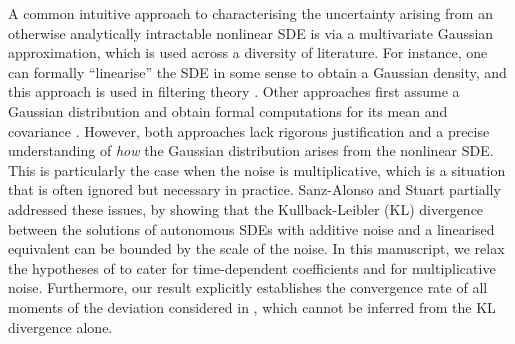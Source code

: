 A common intuitive approach to characterising the uncertainty arising from an otherwise analytically intractable nonlinear SDE is via a multivariate Gaussian approximation, which is used across a diversity of literature. 
For instance, one can formally ``linearise'' the SDE in some sense to obtain a Gaussian density, and this approach is used in filtering theory \cite{Jazwinski_2014_StochasticProcessesFiltering}.
Other approaches first assume a Gaussian distribution and obtain formal computations for its mean and covariance \cite{SarkkaSolin_2019_AppliedStochasticDifferential}.
However, both approaches lack rigorous justification and a precise understanding of \emph{how} the Gaussian distribution arises from the nonlinear SDE.
This is particularly the case when the noise is multiplicative, which is a situation that is often ignored but necessary in practice.
Sanz-Alonso and Stuart \cite{Sanz-AlonsoStuart_2017_GaussianApproximationsSmall} partially addressed these issues, by showing that the Kullback-Leibler (KL) divergence between the solutions of autonomous SDEs with additive noise and a linearised equivalent can be bounded by the scale of the noise. In this manuscript, we relax the hypotheses of \cite{Sanz-AlonsoStuart_2017_GaussianApproximationsSmall} to cater for time-dependent coefficients and for multiplicative noise. Furthermore, our result explicitly establishes the convergence rate of all moments of the deviation considered in \cite{Sanz-AlonsoStuart_2017_GaussianApproximationsSmall}, which cannot be inferred from the KL divergence alone.



